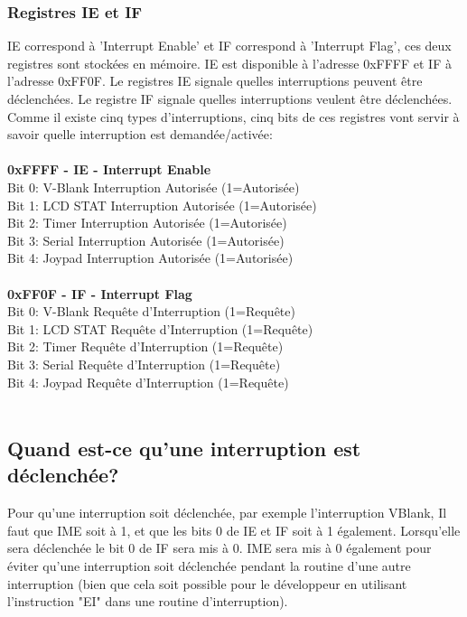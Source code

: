 \documentclass{report}
\begin{document}
\subsubsection{Registres IE et IF} 
IE correspond à 'Interrupt Enable' et IF correspond à 'Interrupt Flag', ces deux registres sont stockées en mémoire. IE est disponible à l'adresse 0xFFFF et IF à l'adresse 0xFF0F. Le registres IE signale quelles interruptions peuvent être déclenchées. Le registre IF signale quelles interruptions veulent être déclenchées.
Comme il existe cinq types d'interruptions, cinq bits de ces registres vont servir à savoir quelle interruption est demandée/activée:\\\\
\textbf{0xFFFF - IE - Interrupt Enable} \\
Bit 0: V-Blank  Interruption Autorisée  (1=Autorisée)\\
Bit 1: LCD STAT Interruption Autorisée  (1=Autorisée)\\
Bit 2: Timer    Interruption Autorisée  (1=Autorisée)\\
Bit 3: Serial   Interruption Autorisée  (1=Autorisée)\\
Bit 4: Joypad   Interruption Autorisée  (1=Autorisée)\\\\
\textbf{0xFF0F - IF - Interrupt Flag} \\
Bit 0: V-Blank  Requête d'Interruption  (1=Requête)\\
Bit 1: LCD STAT Requête d'Interruption  (1=Requête)\\
Bit 2: Timer    Requête d'Interruption  (1=Requête)\\
Bit 3: Serial   Requête d'Interruption  (1=Requête)\\
Bit 4: Joypad   Requête d'Interruption  (1=Requête)\\\\

\subsection{Quand est-ce qu'une interruption est déclenchée?}
Pour qu'une interruption soit déclenchée, par exemple l'interruption VBlank, Il faut que IME soit à 1, et que les bits 0 de IE et IF soit à 1 également.
Lorsqu'elle sera déclenchée le bit 0 de IF sera mis à 0. IME sera mis à 0 également pour éviter qu'une interruption soit déclenchée pendant la routine d'une autre interruption (bien que cela soit possible pour le développeur en utilisant l'instruction "EI" dans une routine d'interruption).
\end{document}
